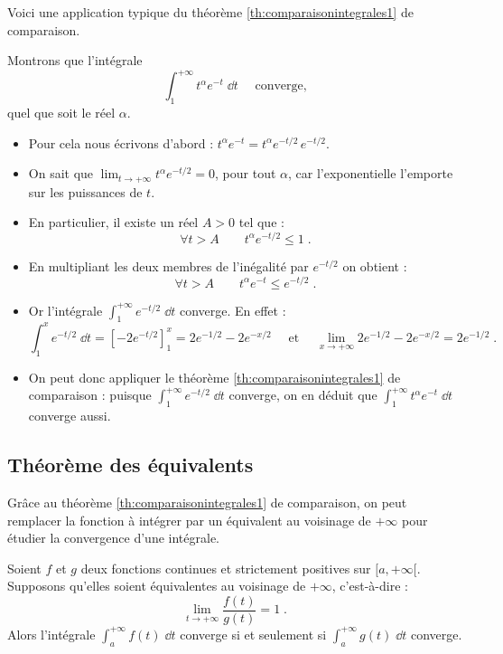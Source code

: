 \documentclass[class=report,crop=false]{standalone}
\begin{document}
Voici une application typique du théorème \ref{th:comparaisonintegrales1} de comparaison.
\begin{exemple}
Montrons que l'intégrale 
$$\int_1^{+\infty} t^\alpha e^{-t}\;\dd t\quad\text{ converge,}$$
quel que soit le réel $\alpha$. 

\begin{itemize}
  \item Pour cela nous écrivons d'abord : $t^\alpha e^{-t} = t^\alpha e^{-t/2}\,e^{-t/2}$.
  
  \item On sait que $\lim_{t\rightarrow+\infty} t^\alpha e^{-t/2} =0$, pour tout $\alpha$, 
  car l'exponentielle l'emporte sur les puissances de $t$.
  
  \item En particulier, il existe un réel $A>0$ tel que :
$$\forall t>A\qquad t^\alpha e^{-t/2}\le 1\;.$$ 
  
  \item En multipliant les deux membres de l'inégalité 
par $e^{-t/2}$ on obtient :
$$\forall t>A\qquad t^\alpha e^{-t}\le e^{-t/2}\;.$$

  \item Or l'intégrale $\int_1^{+\infty} e^{-t/2}\;\dd t$ converge. En effet :
$$
\int_1^x e^{-t/2}\;\dd t = \left[-2 e^{-t/2}\right]_1^x = 
2e^{-1/2} -2e^{-x/2}
\quad\text{ et }\quad
\lim_{x\rightarrow+\infty} 2e^{-1/2} -2e^{-x/2} =
2e^{-1/2}\;. 
$$
  
  \item On peut donc appliquer le théorème \ref{th:comparaisonintegrales1} de
comparaison : 
puisque 
$\int_1^{+\infty} e^{-t/2}\;\dd t$ converge, on en déduit que 
$\int_1^{+\infty} t^\alpha e^{-t}\;\dd t$ converge aussi.
\end{itemize}
\end{exemple}


\subsection{Théorème des équivalents}


Gr\^ace au théorème \ref{th:comparaisonintegrales1} de comparaison, 
on peut remplacer la fonction à intégrer par un équivalent au voisinage de $+\infty$ pour
étudier la convergence d'une intégrale.

\begin{theoreme}
\label{th:equivalentintegrales1}
Soient $f$ et $g$ deux fonctions continues et strictement positives sur
$[a,+\infty[$. Supposons qu'elles soient équivalentes au voisinage de $+\infty$, c'est-à-dire :
$$\lim_{t\rightarrow+\infty}\frac{f(t)}{g(t)} = 1\;.$$
Alors l'intégrale $\int_a^{+\infty} f(t)\;\dd t$ converge si et seulement si 
$\int_a^{+\infty} g(t)\;\dd t$ converge.
\end{theoreme}
\end{document}
